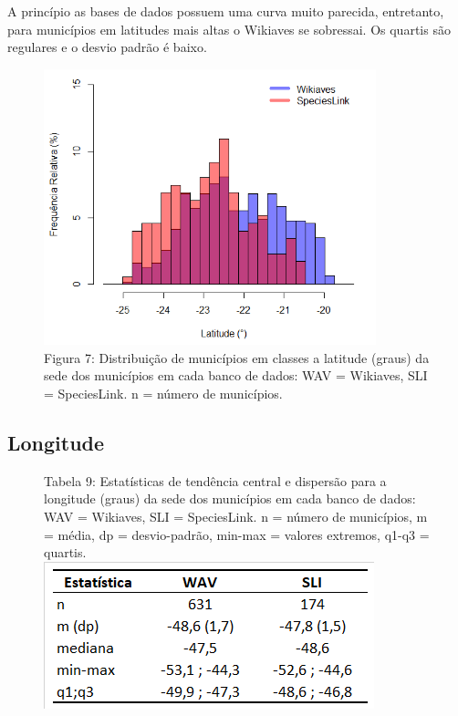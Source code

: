\begin{resposta}
A princípio as bases de dados possuem uma curva muito parecida, entretanto, para municípios em latitudes mais altas o Wikiaves se sobressai. Os quartis são regulares e o desvio padrão é baixo. 
\end{resposta}

\begin{figure}[h!]
\centering
\includegraphics[height = 8cm]{Imagens/H07.png}
\\{\scriptsize Figura 7: Distribuição de municípios em classes a latitude (graus) da sede dos municípios em cada banco de dados: WAV = Wikiaves, SLI = SpeciesLink. n = número de municípios.}
\end{figure}

\newpage

\subsection{Longitude}


\begin{figure}[h!]
\centering
{\scriptsize Tabela 9: Estatísticas de tendência central e dispersão para a longitude (graus) da sede dos municípios em cada banco de dados: WAV = Wikiaves, SLI = SpeciesLink. n = número de municípios, m = média, dp = desvio-padrão, min-max = valores extremos, q1-q3 = quartis.}
\\
\includegraphics{Imagens/T09.png}
\end{figure}

